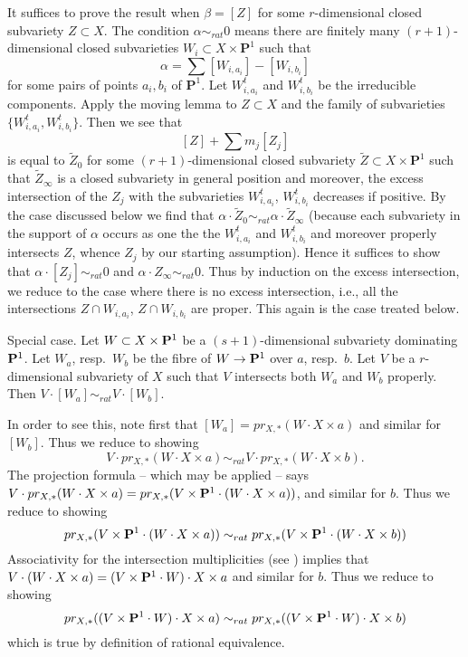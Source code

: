 \medskip\noindent
It suffices to prove the result when $\beta = [Z]$
for some $r$-dimensional closed subvariety $Z \subset X$.
The condition $\alpha \sim_{rat} 0$ means there
are finitely many $(r + 1)$-dimensional closed subvarieties
$W_i \subset X \times \mathbf{P}^1$ such that
$$
\alpha = \sum [W_{i, a_i}] - [W_{i, b_i}]
$$
for some pairs of points $a_i, b_i$ of $\mathbf{P}^1$.
Let $W_{i, a_i}^t$ and $W_{i, b_i}^t$ be the irreducible components.
Apply the moving lemma to $Z \subset X$ and the family of
subvarieties $\{W_{i, a_i}^t, W_{i, b_i}^t\}$. Then we see that
$$
[Z] + \sum m_j [Z_j]
$$
is equal to $\tilde Z_0$ for some $(r + 1)$-dimensional closed subvariety
$\tilde Z \subset X \times \mathbf{P}^1$ such that $\tilde Z_\infty$
is a closed subvariety in general position
and moreover, the excess intersection of the
$Z_j$ with the subvarieties $W_{i, a_i}^t$, $W_{i, b_i}^t$ decreases
if positive.
By the case discussed below we find that
$\alpha \cdot \tilde Z_0 \sim_{rat} \alpha \cdot \tilde Z_\infty$
(because each subvariety in the support of $\alpha$ occurs
as one the the $W_{i, a_i}^t$ and $W_{i, b_i}^t$ and moreover
properly intersects $Z$, whence $Z_j$ by our starting assumption).
Hence it suffices to show that
$\alpha \cdot [Z_j] \sim_{rat} 0$ and
$\alpha \cdot Z_\infty \sim_{rat} 0$.
Thus by induction on the excess intersection, we reduce to the
case where there is no excess intersection, i.e., all the
intersections $Z \cap W_{i, a_i}$, $Z \cap W_{i, b_i}$ are
proper. This again is the case treated below.

\medskip\noindent
Special case. Let $W \subset X \times {\bf P}^1$
be a $(s + 1)$-dimensional subvariety dominating ${\bf P}^1$.
Let $W_a$, resp.\ $W_b$ be the fibre of $W \to {\bf P}^1$
over $a$, resp.\ $b$. Let $V$ be a $r$-dimensional
subvariety of $X$ such that $V$ intersects both $W_a$ and
$W_b$ properly. Then $V \cdot [W_a] \sim_{rat} V \cdot [W_b]$.

\medskip\noindent
In order to see this, note first that
$[W_a] = pr_{X,*}( W \cdot X\times a)$ and similar for $[W_b]$.
Thus we reduce to showing
$$
V \cdot pr_{X,*}( W \cdot X\times a) \sim_{rat} V \cdot
pr_{X,*}( W \cdot X\times b).
$$
The projection formula -- which may be applied -- says
$V \cdot pr_{X,*}( W \cdot X\times a) =
pr_{X,*}(V \times {\bf P}^1 \cdot (W \cdot X\times a))$,
and similar for $b$. Thus we reduce to showing
$$
pr_{X,*}(V \times {\bf P}^1 \cdot (W \cdot X\times a))
\sim_{rat}
pr_{X,*}(V \times {\bf P}^1 \cdot (W \cdot X\times b))
$$
Associativity for the intersection multiplicities (see
\cite[Chapter V]{Serre_algebre_locale})
implies that $V \cdot (W \cdot X\times a) =
(V \times {\bf P}^1 \cdot W) \cdot X \times a$
and similar for $b$.  Thus we reduce to showing
$$
pr_{X,*}((V \times {\bf P}^1 \cdot W) \cdot X\times a)
\sim_{rat}
pr_{X,*}((V \times {\bf P}^1 \cdot W) \cdot X\times b)
$$
which is true by definition of rational equivalence.


